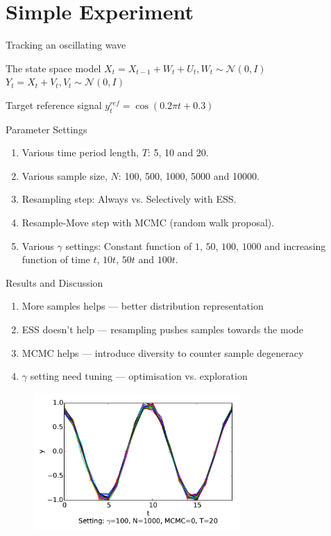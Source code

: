 \documentclass[handout]{beamer}
\begin{document}
\section{Simple Experiment}
\begin{frame}{Tracking an oscillating wave}
\begin{block}{The state space model}
  $X_t = X_{t-1} + W_t + U_t, W_t \sim \mathcal{N}(0,I)$
  $Y_t = X_t + V_t, V_t \sim \mathcal{N}(0,I)$
\end{block}

\begin{block}{Target reference signal}
$y^{ref}_t = \cos(0.2 \pi t + 0.3)$ 
\end{block}

\begin{block}{Parameter Settings}
\begin{enumerate}
\item Various time period length, $T$: 5, 10 and 20.
\item Various sample size, $N$: 100, 500, 1000, 5000 and 10000.
\item Resampling step: Always vs. Selectively with ESS.
\item Resample-Move step with MCMC (random walk proposal).
\item Various $\gamma$ settings: Constant function of $1$, $50$, $100$, $1000$ and increasing function of time $t$, $10t$, $50t$ and $100t$.
\end{enumerate}
\end{block}
\end{frame}

\begin{frame}{ Results and Discussion}
\begin{enumerate}
\item More samples helps --- better distribution representation
\item ESS doesn't help --- resampling pushes samples towards the mode
\item MCMC helps --- introduce diversity to counter sample degeneracy
\item $\gamma$ setting need tuning --- optimisation vs. exploration
\end{enumerate}

  \begin{figure}
    \centering
    \includegraphics[width = 0.7\textwidth]{figures/output_y/output_20_100.pdf}
  \end{figure}
\end{frame}
\end{document}
